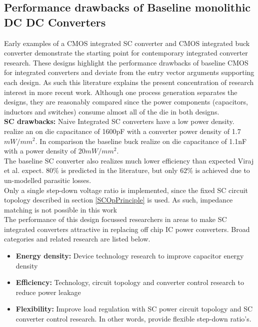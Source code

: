 \documentclass[letterpaper,twocolumn,10pt]{article}
\begin{document}
\subsection{Performance drawbacks of Baseline monolithic DC DC Converters}
Early examples of a CMOS integrated SC converter \cite{Viraj2007} and CMOS integrated buck converter \cite{Alimadadi2008} demonstrate the starting point for contemporary integrated converter research. These designs highlight the performance drawbacks of baseline CMOS for integrated converters and deviate from the entry vector arguments supporting each design. As such this literature explains the present concentration of research interest in more recent work. %
Although one process generation separates the designs, they are reasonably compared since the power components (capacitors, inductors and switches) consume almost all of the die in both designs.\\ 
\textbf{SC drawbacks: } Naive Integrated SC converters have a low power density. \cite{Viraj2007} realize an on die capacitance of 1600pF with a converter power density of 1.7$mW/mm^2$. In comparison  the baseline buck \cite{Alimadadi2008} realize on die capacitance of 1.1nF with a power density of 20$mW/mm^2$.\\
The baseline SC converter also realizes much lower efficiency than expected Viraj et al. expect. $80\%$ is predicted in the literature, but only $62\%$ is achieved due to un-modelled parasitic losses.\\
Only a single step-down voltage ratio is implemented, since the fixed SC circuit topology described in section \ref{SCOpPrinciple} is used. As such, impedance matching is not possible in this work\\
The performance of this design focussed researchers in areas to make SC integrated converters attractive in replacing off chip IC power converters. Broad categories and related research are listed below.\\
\begin{itemize}
\item \textbf{Energy density: }Device technology research to improve capacitor energy density
\item \textbf{Efficiency: }Technology, circuit topology and converter control research to reduce power leakage
\item \textbf{Flexibility: }Improve load regulation with SC power circuit topology and SC converter control research. In other words, provide flexible step-down ratio's. 
\end{itemize}
\end{document}
